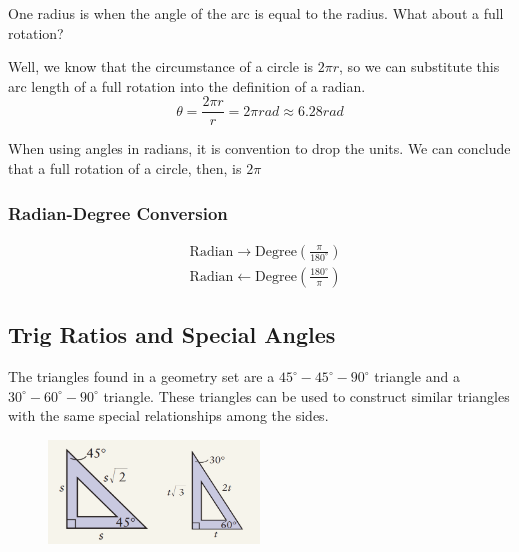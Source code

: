 \documentclass{article}
\begin{document}
One radius is when the angle of the arc is equal to the radius. What about a full rotation?

Well, we know that the circumstance of a circle is $2\pi r$, so we can substitute this arc length of a full rotation into the definition of a radian.
$$\theta = \frac{2\pi r}{r}=2 \pi rad \approx 6.28 rad$$

When using angles in radians, it is convention to drop the units. We can conclude that a full rotation of a circle, then, is $2\pi$


\subsubsection{Radian-Degree Conversion}
\begin{align*}
&\text{Radian} \longrightarrow \text{Degree} \left(\frac{\pi}{180^{\circ}}\right)\\
&\text{Radian} \longleftarrow \text{Degree} \left(\frac{180^{\circ}}{\pi}\right)
\end{align*}

\newpage
\subsection{Trig Ratios and Special Angles}
The triangles found in a geometry set are a $45^{\circ}-45^{\circ}-90^{\circ}$ triangle and a $30^{\circ}-60^{\circ}-90^{\circ}$ triangle. These triangles can be used to construct similar triangles with 
the same special relationships among the sides.

\begin{figure}[ht]
    \centering
    \includegraphics[width=0.5\textwidth]{imgs/special trigs.PNG}
\end{figure}
\end{document}
